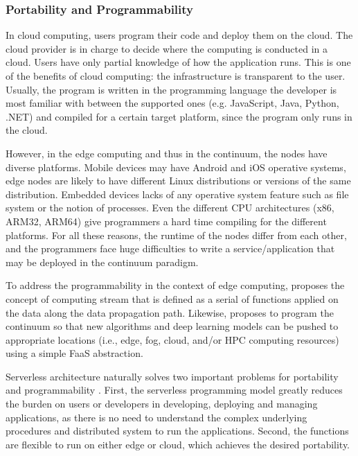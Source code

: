 \documentclass{ieeeaccess}
\begin{document}
\subsubsection{Portability and Programmability}

In cloud computing, users program their code and deploy them on the cloud. The cloud provider is in charge to decide where the computing is conducted in a cloud. Users have only partial knowledge of how the application runs. This is one of the benefits of cloud computing: the infrastructure is transparent to the user. Usually, the program is written in the programming language the developer is most familiar with between the supported ones (e.g. JavaScript, Java, Python, .NET) and compiled for a certain target platform, since the program only runs in the cloud.

However, in the edge computing and thus in the continuum, the nodes have diverse platforms. Mobile devices may have Android and iOS operative systems, edge nodes are likely to have different Linux distributions or versions of the same distribution. Embedded devices lacks of any operative system feature such as file system or the notion of processes. Even the different CPU architectures (x86, ARM32, ARM64) give programmers a hard time compiling for the different platforms. For all these reasons, the runtime of the nodes differ from each other, and the programmers face huge difficulties to write a service/application that may be deployed in the continuum paradigm.

To address the programmability in the context of edge computing, \cite{edge-computing-vision-challenges} proposes the concept of computing stream that is defined as a serial of functions applied on the data along the data propagation path. Likewise, \cite{harnessing-continuum} proposes to program the continuum so that new algorithms and deep learning models can be pushed to appropriate locations (i.e., edge, fog, cloud, and/or HPC computing resources) using a simple FaaS abstraction.

Serverless architecture naturally solves two important problems for portability and programmability \cite{lavea}. First, the serverless programming model greatly reduces the burden on users or developers in developing, deploying and managing applications, as there is no need to understand the complex underlying procedures and distributed system to run the applications. Second, the functions are flexible to run on either edge or cloud, which achieves the desired portability.
\end{document}
